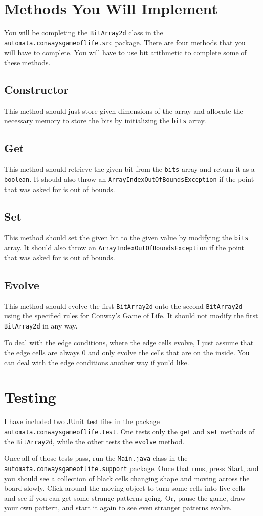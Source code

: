 \documentclass[a4paper]{article}
\newcommand{\inlinecode}{\texttt}
\begin{document}
\section{Methods You Will Implement}
You will be completing the \inlinecode{BitArray2d} class in the \inlinecode{automata.conwaysgameoflife.src} package. There are four methods that you will have to complete. You will have to use bit arithmetic to complete some of these methods.
\subsection{Constructor}
This method should just store given dimensions of the array and allocate the necessary memory to store the bits by initializing the \inlinecode{bits} array.
\subsection{Get}
This method should retrieve the given bit from the \inlinecode{bits} array and return it as a \inlinecode{boolean}. It should also throw an \inlinecode{ArrayIndexOutOfBoundsException} if the point that was asked for is out of bounds.
\subsection{Set}
This method should set the given bit to the given value by modifying the \inlinecode{bits} array. It should also throw an \inlinecode{ArrayIndexOutOfBoundsException} if the point that was asked for is out of bounds.
\subsection{Evolve}
This method should evolve the first \inlinecode{BitArray2d} onto the second \inlinecode{BitArray2d} using the specified rules for Conway's Game of Life. It should not modify the first \inlinecode{BitArray2d} in any way.

To deal with the edge conditions, where the edge cells evolve, I just assume that the edge cells are always 0 and only evolve the cells that are on the inside. You can deal with the edge conditions another way if you'd like.
\section{Testing}
I have included two JUnit test files in the package \inlinecode{automata.conwaysgameoflife.test}. One tests only the \inlinecode{get} and \inlinecode{set} methods of the \inlinecode{BitArray2d}, while the other tests the \inlinecode{evolve} method.

Once all of those tests pass, run the \inlinecode{Main.java} class in the \inlinecode{automata.conwaysgameoflife.support} package. Once that runs, press Start, and you should see a collection of black cells changing shape and moving across the board slowly. Click around the moving object to turn some cells into live cells and see if you can get some strange patterns going. Or, pause the game, draw your own pattern, and start it again to see even stranger patterns evolve.
\end{document}
